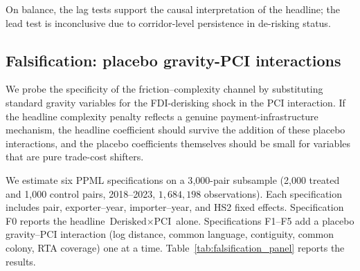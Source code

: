On balance, the lag tests support the causal interpretation of the headline; the lead test is inconclusive due to corridor-level persistence in de-risking status.

\subsection{Falsification: placebo gravity-PCI interactions}
\label{subsec:falsification_placebo}

We probe the specificity of the friction--complexity channel by substituting standard gravity variables for the FDI-derisking shock in the PCI interaction. If the headline complexity penalty reflects a genuine payment-infrastructure mechanism, the headline coefficient should survive the addition of these placebo interactions, and the placebo coefficients themselves should be small for variables that are pure trade-cost shifters.

We estimate six PPML specifications on a 3{,}000-pair subsample (2{,}000 treated and 1{,}000 control pairs, 2018--2023, $1{,}684{,}198$ observations). Each specification includes pair, exporter--year, importer--year, and HS2 fixed effects. Specification F0 reports the headline $\text{Derisked} \times \text{PCI}$ alone. Specifications F1--F5 add a placebo gravity--PCI interaction (log distance, common language, contiguity, common colony, RTA coverage) one at a time. Table~\ref{tab:falsification_panel} reports the results.

\begin{table}[htbp]
\centering
\caption{Falsification: Placebo Gravity--PCI Interactions}
\label{tab:falsification_panel}
\begin{threeparttable}
\scriptsize
\setlength{\tabcolsep}{4pt}

\begin{tablenotes}
\end{tablenotes}
\end{threeparttable}
\end{table}

